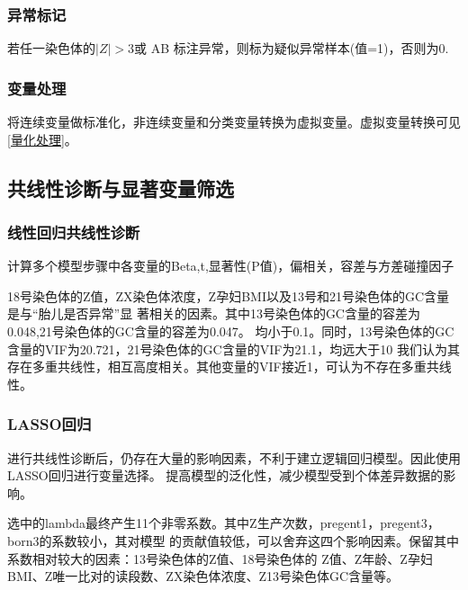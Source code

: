 \documentclass[withoutpreface,notoc]{cumcmthesis}
\begin{document}
	\subsubsection{异常标记}

	若任一染色体的$|Z|>3$或 AB 标注异常，则标为疑似异常样本(值=1)，否则为0.


	\subsubsection{变量处理}

	将连续变量做标准化，非连续变量和分类变量转换为虚拟变量。虚拟变量转换可见\cref{量化处理}。

	

	\subsection{共线性诊断与显著变量筛选}

	\subsubsection{线性回归共线性诊断}
	计算多个模型步骤中各变量的Beta,t,显著性(P值)，偏相关，容差与方差碰撞因子











	18号染色体的Z值，ZX染色体浓度，Z孕妇BMI以及13号和21号染色体的GC含量是与“胎儿是否异常”显
	著相关的因素。其中13号染色体的GC含量的容差为0.048,21号染色体的GC含量的容差为0.047。
	均小于0.1。同时，13号染色体的GC含量的VIF为20.721，21号染色体的GC含量的VIF为21.1，均远大于10
	我们认为其存在多重共线性，相互高度相关。其他变量的VIF接近1，可认为不存在多重共线性。



	\subsubsection{LASSO回归}
	进行共线性诊断后，仍存在大量的影响因素，不利于建立逻辑回归模型。因此使用LASSO回归进行变量选择。
	提高模型的泛化性，减少模型受到个体差异数据的影响。




	选中的lambda最终产生11个非零系数。其中Z生产次数，pregent1，pregent3，born3的系数较小，其对模型
	的贡献值较低，可以舍弃这四个影响因素。保留其中系数相对较大的因素：13号染色体的Z值、18号染色体的
	Z值、Z年龄、Z孕妇BMI、Z唯一比对的读段数、ZX染色体浓度、Z13号染色体GC含量等。
\end{document}
